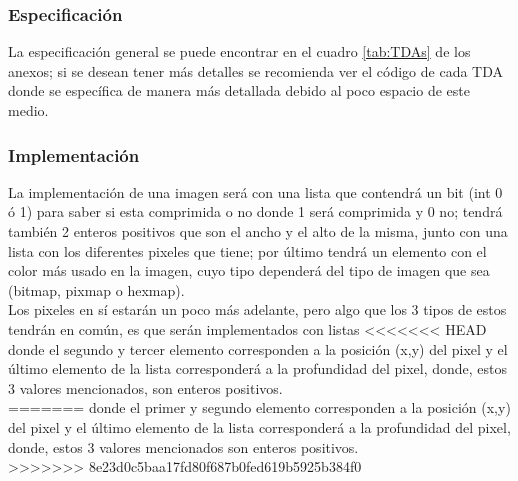  \subsubsection{Especificación}
    La especificación general se puede encontrar en el cuadro \ref{tab:TDAs} de los anexos;
    si se desean tener más detalles se recomienda ver el código de cada TDA donde se específica
    de manera más detallada debido al poco espacio de este medio.

  \subsubsection{Implementación}
    La implementación de una imagen será con una lista que contendrá un bit (int 0 ó 1) para saber si esta comprimida o no
    donde 1 será comprimida y 0 no; tendrá también 2 enteros positivos que son el ancho y el alto de la misma, junto
    con una lista con los diferentes pixeles que tiene; por último tendrá un elemento con el color más
    usado en la imagen, cuyo tipo dependerá del tipo de imagen que sea (bitmap, pixmap o hexmap).\\

    Los pixeles en sí estarán un poco más adelante, pero algo que los 3 tipos de estos tendrán en común, es que serán implementados con listas 
<<<<<<< HEAD
    donde el segundo y tercer elemento corresponden a la posición (x,y) del pixel y el último elemento de la lista
    corresponderá a la profundidad del pixel, donde, estos 3 valores mencionados, son enteros positivos.\\
=======
    donde el primer y segundo elemento corresponden a la posición (x,y) del pixel y el último elemento de la lista
    corresponderá a la profundidad del pixel, donde, estos 3 valores mencionados son enteros positivos.\\
>>>>>>> 8e23d0c5baa17fd80f687b0fed619b5925b384f0


